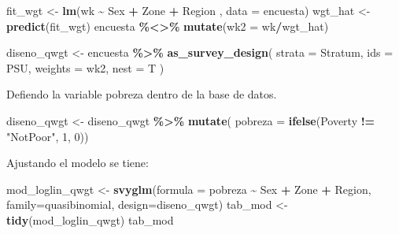 \documentclass[
  12pt,
]{book}
\newenvironment{Shaded}{\begin{snugshade}}{\end{snugshade}}
\newcommand{\AttributeTok}[1]{\textcolor[rgb]{0.13,0.29,0.53}{#1}}
\newcommand{\DecValTok}[1]{\textcolor[rgb]{0.00,0.00,0.81}{#1}}
\newcommand{\FunctionTok}[1]{\textcolor[rgb]{0.13,0.29,0.53}{\textbf{#1}}}
\newcommand{\NormalTok}[1]{#1}
\newcommand{\OtherTok}[1]{\textcolor[rgb]{0.56,0.35,0.01}{#1}}
\newcommand{\SpecialCharTok}[1]{\textcolor[rgb]{0.81,0.36,0.00}{\textbf{#1}}}
\newcommand{\StringTok}[1]{\textcolor[rgb]{0.31,0.60,0.02}{#1}}
\begin{document}
\begin{Shaded}
\begin{Highlighting}[]
\NormalTok{  fit\_wgt }\OtherTok{\textless{}{-}} \FunctionTok{lm}\NormalTok{(wk }\SpecialCharTok{\textasciitilde{}}\NormalTok{  Sex }\SpecialCharTok{+}\NormalTok{ Zone }\SpecialCharTok{+}\NormalTok{ Region ,}
                \AttributeTok{data =}\NormalTok{ encuesta)}
\NormalTok{  wgt\_hat }\OtherTok{\textless{}{-}} \FunctionTok{predict}\NormalTok{(fit\_wgt)}
\NormalTok{  encuesta }\SpecialCharTok{\%\textless{}\textgreater{}\%} \FunctionTok{mutate}\NormalTok{(}\AttributeTok{wk2 =}\NormalTok{ wk}\SpecialCharTok{/}\NormalTok{wgt\_hat)}
  
\NormalTok{  diseno\_qwgt }\OtherTok{\textless{}{-}}\NormalTok{ encuesta }\SpecialCharTok{\%\textgreater{}\%}
    \FunctionTok{as\_survey\_design}\NormalTok{(}
      \AttributeTok{strata =}\NormalTok{ Stratum,}
      \AttributeTok{ids =}\NormalTok{ PSU,}
      \AttributeTok{weights =}\NormalTok{ wk2,}
      \AttributeTok{nest =}\NormalTok{ T}
\NormalTok{    )}
\end{Highlighting}
\end{Shaded}

Defiendo la variable pobreza dentro de la base de datos.

\begin{Shaded}
\begin{Highlighting}[]
\NormalTok{diseno\_qwgt }\OtherTok{\textless{}{-}}\NormalTok{ diseno\_qwgt }\SpecialCharTok{\%\textgreater{}\%} \FunctionTok{mutate}\NormalTok{(}
\AttributeTok{pobreza =} \FunctionTok{ifelse}\NormalTok{(Poverty }\SpecialCharTok{!=} \StringTok{"NotPoor"}\NormalTok{, }\DecValTok{1}\NormalTok{, }\DecValTok{0}\NormalTok{))}
\end{Highlighting}
\end{Shaded}

Ajustando el modelo se tiene:

\begin{Shaded}
\begin{Highlighting}[]
\NormalTok{mod\_loglin\_qwgt }\OtherTok{\textless{}{-}} \FunctionTok{svyglm}\NormalTok{(}\AttributeTok{formula =}\NormalTok{ pobreza }\SpecialCharTok{\textasciitilde{}}\NormalTok{ Sex }\SpecialCharTok{+}\NormalTok{ Zone }\SpecialCharTok{+}\NormalTok{ Region,}
                          \AttributeTok{family=}\NormalTok{quasibinomial,}
                          \AttributeTok{design=}\NormalTok{diseno\_qwgt)}
\NormalTok{tab\_mod }\OtherTok{\textless{}{-}} \FunctionTok{tidy}\NormalTok{(mod\_loglin\_qwgt)}
\NormalTok{tab\_mod}
\end{Highlighting}
\end{Shaded}
\end{document}
